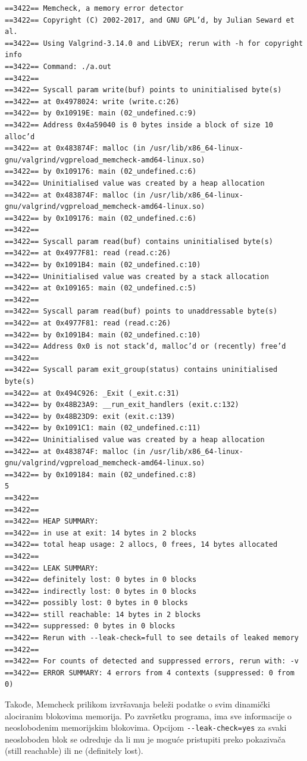 \begin{verbatim}
==3422== Memcheck, a memory error detector
==3422== Copyright (C) 2002-2017, and GNU GPL’d, by Julian Seward et al.
==3422== Using Valgrind-3.14.0 and LibVEX; rerun with -h for copyright info
==3422== Command: ./a.out
==3422==
==3422== Syscall param write(buf) points to uninitialised byte(s)
==3422== at 0x4978024: write (write.c:26)
==3422== by 0x10919E: main (02_undefined.c:9)
==3422== Address 0x4a59040 is 0 bytes inside a block of size 10 alloc’d
==3422== at 0x483874F: malloc (in /usr/lib/x86_64-linux-gnu/valgrind/vgpreload_memcheck-amd64-linux.so)
==3422== by 0x109176: main (02_undefined.c:6)
==3422== Uninitialised value was created by a heap allocation
==3422== at 0x483874F: malloc (in /usr/lib/x86_64-linux-gnu/valgrind/vgpreload_memcheck-amd64-linux.so)
==3422== by 0x109176: main (02_undefined.c:6)
==3422==
==3422== Syscall param read(buf) contains uninitialised byte(s)
==3422== at 0x4977F81: read (read.c:26)
==3422== by 0x1091B4: main (02_undefined.c:10)
==3422== Uninitialised value was created by a stack allocation
==3422== at 0x109165: main (02_undefined.c:5)
==3422==
==3422== Syscall param read(buf) points to unaddressable byte(s)
==3422== at 0x4977F81: read (read.c:26)
==3422== by 0x1091B4: main (02_undefined.c:10)
==3422== Address 0x0 is not stack’d, malloc’d or (recently) free’d
==3422==
==3422== Syscall param exit_group(status) contains uninitialised byte(s)
==3422== at 0x494C926: _Exit (_exit.c:31)
==3422== by 0x48B23A9: __run_exit_handlers (exit.c:132)
==3422== by 0x48B23D9: exit (exit.c:139)
==3422== by 0x1091C1: main (02_undefined.c:11)
==3422== Uninitialised value was created by a heap allocation
==3422== at 0x483874F: malloc (in /usr/lib/x86_64-linux-gnu/valgrind/vgpreload_memcheck-amd64-linux.so)
==3422== by 0x109184: main (02_undefined.c:8)
5
==3422==
==3422==
==3422== HEAP SUMMARY:
==3422== in use at exit: 14 bytes in 2 blocks
==3422== total heap usage: 2 allocs, 0 frees, 14 bytes allocated
==3422==
==3422== LEAK SUMMARY:
==3422== definitely lost: 0 bytes in 0 blocks
==3422== indirectly lost: 0 bytes in 0 blocks
==3422== possibly lost: 0 bytes in 0 blocks
==3422== still reachable: 14 bytes in 2 blocks
==3422== suppressed: 0 bytes in 0 blocks
==3422== Rerun with --leak-check=full to see details of leaked memory
==3422==
==3422== For counts of detected and suppressed errors, rerun with: -v
==3422== ERROR SUMMARY: 4 errors from 4 contexts (suppressed: 0 from 0)
\end{verbatim}

Takođe, Memcheck prilikom izvršavanja beleži podatke o svim dinamički alociranim blokovima memorija. Po završetku programa, ima sve informacije o neoslobodenim memorijskim blokovima. Opcijom \texttt{-\/-leak-check=yes} za svaki neosloboden blok se odreduje da li mu je moguće pristupiti preko pokazivača (still reachable) ili ne (definitely lost).

